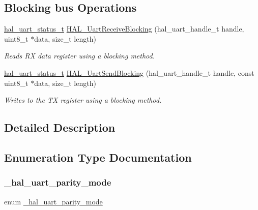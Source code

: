 \subsection*{Blocking bus Operations}
\begin{DoxyCompactItemize}
\item 
\mbox{\hyperlink{group___u_a_r_t___adapter_ga352ee9bdc398eba4262ca7656f9c5e50}{hal\+\_\+uart\+\_\+status\+\_\+t}} \mbox{\hyperlink{group___u_a_r_t___adapter_ga652499fca5739b0d61df775e371279bb}{H\+A\+L\+\_\+\+Uart\+Receive\+Blocking}} (hal\+\_\+uart\+\_\+handle\+\_\+t handle, uint8\+\_\+t $\ast$data, size\+\_\+t length)
\begin{DoxyCompactList}\small\item\em Reads RX data register using a blocking method. \end{DoxyCompactList}\item 
\mbox{\hyperlink{group___u_a_r_t___adapter_ga352ee9bdc398eba4262ca7656f9c5e50}{hal\+\_\+uart\+\_\+status\+\_\+t}} \mbox{\hyperlink{group___u_a_r_t___adapter_gae7104925b7bff899a7631c5ee708dc5c}{H\+A\+L\+\_\+\+Uart\+Send\+Blocking}} (hal\+\_\+uart\+\_\+handle\+\_\+t handle, const uint8\+\_\+t $\ast$data, size\+\_\+t length)
\begin{DoxyCompactList}\small\item\em Writes to the TX register using a blocking method. \end{DoxyCompactList}\end{DoxyCompactItemize}


\subsection{Detailed Description}


\subsection{Enumeration Type Documentation}
\mbox{\label{group___u_a_r_t___adapter_ga4bfc5f54ba1569ae2dfcc1d7ae0be0f3}} 
\subsubsection{\texorpdfstring{\_hal\_uart\_parity\_mode}{\_hal\_uart\_parity\_mode}}
{\footnotesize\ttfamily enum \mbox{\hyperlink{group___u_a_r_t___adapter_ga4bfc5f54ba1569ae2dfcc1d7ae0be0f3}{\+\_\+hal\+\_\+uart\+\_\+parity\+\_\+mode}}}



